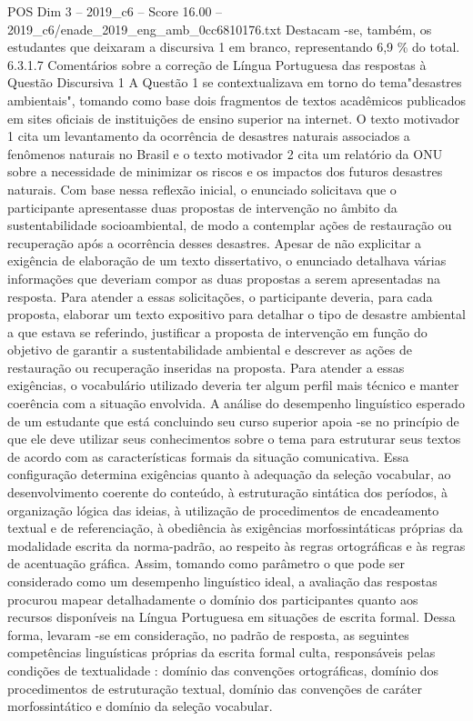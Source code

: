 \begin{textsample}{POS Dim 3 – 2019\_c6 – Score 16.00 – 2019\_c6/enade\_2019\_eng\_amb\_0cc6810176.txt}
Destacam -se, também, os estudantes que deixaram a discursiva 1 em branco, representando 6,9 \% do total. 6.3.1.7 Comentários sobre a correção de Língua Portuguesa das respostas à Questão Discursiva 1 A Questão 1 se contextualizava em torno do tema"desastres ambientais", tomando como base dois fragmentos de textos acadêmicos publicados em sites oficiais de instituições de ensino superior na internet.
O texto motivador 1 cita um levantamento da ocorrência de desastres naturais associados a fenômenos naturais no Brasil e o texto motivador 2 cita um relatório da ONU sobre a necessidade de minimizar os riscos e os impactos dos futuros desastres naturais.
Com base nessa reflexão inicial, o enunciado solicitava que o participante apresentasse duas propostas de intervenção no âmbito da sustentabilidade socioambiental, de modo a contemplar ações de restauração ou recuperação após a ocorrência desses desastres.
Apesar de não explicitar a exigência de elaboração de um texto dissertativo, o enunciado detalhava várias informações que deveriam compor as duas propostas a serem apresentadas na resposta.
Para atender a essas solicitações, o participante deveria, para cada proposta, elaborar um texto expositivo para detalhar o tipo de desastre ambiental a que estava se referindo, justificar a proposta de intervenção em função do objetivo de garantir a sustentabilidade ambiental e descrever as ações de restauração ou recuperação inseridas na proposta.
Para atender a essas exigências, o vocabulário utilizado deveria ter algum perfil mais técnico e manter coerência com a situação envolvida.
A análise do desempenho linguístico esperado de um estudante que está concluindo seu curso superior apoia -se no princípio de que ele deve utilizar seus conhecimentos sobre o tema para estruturar seus textos de acordo com as características formais da situação comunicativa.
Essa configuração determina exigências quanto à adequação da seleção vocabular, ao desenvolvimento coerente do conteúdo, à estruturação sintática dos períodos, à organização lógica das ideias, à utilização de procedimentos de encadeamento textual e de referenciação, à obediência às exigências morfossintáticas próprias da modalidade escrita da norma-padrão, ao respeito às regras ortográficas e às regras de acentuação gráfica.
Assim, tomando como parâmetro o que pode ser considerado como um desempenho linguístico ideal, a avaliação das respostas procurou mapear detalhadamente o domínio dos participantes quanto aos recursos disponíveis na Língua Portuguesa em situações de escrita formal.
Dessa forma, levaram -se em consideração, no padrão de resposta, as seguintes competências linguísticas próprias da escrita formal culta, responsáveis pelas condições de textualidade : domínio das convenções ortográficas, domínio dos procedimentos de estruturação textual, domínio das convenções de caráter morfossintático e domínio da seleção vocabular.

\end{textsample}
